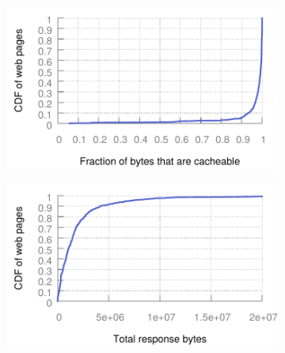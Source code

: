\begin{figure}[!htb]
\hspace{0.01in}
\begin{subfigure}{0.33\textwidth}
    \hspace*{-0.11in}
    \includegraphics[width=\textwidth]{../graphs/cacheable_bytes/cacheable_bytes_linear.pdf}
    \caption[]{\label{fig:cacheable_bytes_linear}}
\end{subfigure}\hfill
\begin{subfigure}{0.33\textwidth}
    \hspace*{-0.11in}
    \includegraphics[width=\textwidth]{../graphs/total_bytes/total_bytes_linear.pdf}
    \caption[]{\label{fig:total_bytes_linear}}
\end{subfigure}\hfill
\begin{subfigure}{0.33\textwidth}
    \hspace*{-0.11in}

\end{subfigure}
\end{figure}
